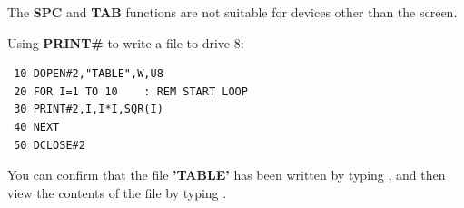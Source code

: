 \begin{description}[leftmargin=2cm,style=nextline]
\item [Remarks:] The {\bf SPC} and {\bf TAB} functions
                 are not suitable for devices other than the screen.

\item [Example:] Using {\bf PRINT\#} to write a file to drive 8:

\begin{tcolorbox}[colback=black,coltext=white]
\verbatimfont{\codefont}
\begin{verbatim}
 10 DOPEN#2,"TABLE",W,U8
 20 FOR I=1 TO 10    : REM START LOOP
 30 PRINT#2,I,I*I,SQR(I)
 40 NEXT
 50 DCLOSE#2
\end{verbatim}
\end{tcolorbox}

    You can confirm that the file {\bf 'TABLE'} has been written by typing
    , and then view the contents of the file
    by typing .
\end{description}


\newpage
